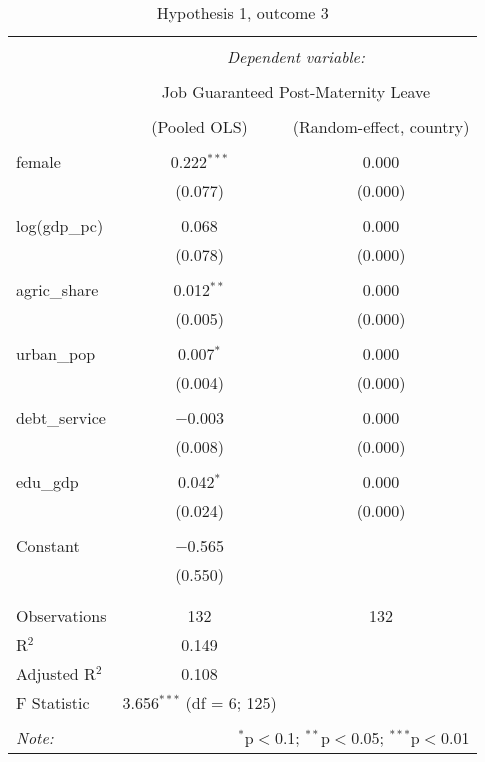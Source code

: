 \documentclass[12pt]{article}
\begin{document}
\begin{table}[!htbp] \centering 
  \caption{Hypothesis 1, outcome 3} 
  \label{} 
\begin{tabular}{@{\extracolsep{5pt}}lcc} 
\\[-1.8ex]\hline 
\hline \\[-1.8ex] 
 & \multicolumn{2}{c}{\textit{Dependent variable:}} \\ 
\cline{2-3} 
\\[-1.8ex] & \multicolumn{2}{c}{Job Guaranteed Post-Maternity Leave} \\ 
\\[-1.8ex] & (Pooled OLS) & (Random-effect, country)\\ 
\hline \\[-1.8ex] 
 female & 0.222$^{***}$ & 0.000 \\ 
  & (0.077) & (0.000) \\ 
  & & \\ 
 log(gdp\_pc) & 0.068 & 0.000 \\ 
  & (0.078) & (0.000) \\ 
  & & \\ 
 agric\_share & 0.012$^{**}$ & 0.000 \\ 
  & (0.005) & (0.000) \\ 
  & & \\ 
 urban\_pop & 0.007$^{*}$ & 0.000 \\ 
  & (0.004) & (0.000) \\ 
  & & \\ 
 debt\_service & $-$0.003 & 0.000 \\ 
  & (0.008) & (0.000) \\ 
  & & \\ 
 edu\_gdp & 0.042$^{*}$ & 0.000 \\ 
  & (0.024) & (0.000) \\ 
  & & \\ 
 Constant & $-$0.565 &  \\ 
  & (0.550) &  \\ 
  & & \\ 
\hline \\[-1.8ex] 
Observations & 132 & 132 \\ 
R$^{2}$ & 0.149 &  \\ 
Adjusted R$^{2}$ & 0.108 &  \\ 
F Statistic & 3.656$^{***}$ (df = 6; 125) &  \\ 
\hline 
\hline \\[-1.8ex] 
\textit{Note:}  & \multicolumn{2}{r}{$^{*}$p$<$0.1; $^{**}$p$<$0.05; $^{***}$p$<$0.01} \\ 
\end{tabular} 
\end{table}
\end{document}
